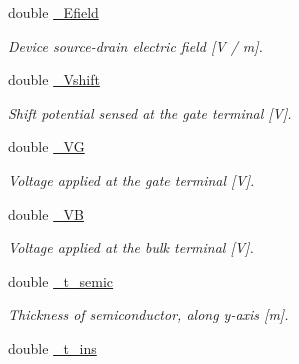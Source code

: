 \begin{DoxyCompactItemize}
\mbox{\label{class_probl_afad911eeef119fd9fd5f032c653402bb}} 
double \mbox{\hyperlink{class_probl_afad911eeef119fd9fd5f032c653402bb}{\+\_\+\+Efield}}
\begin{DoxyCompactList}\small\item\em Device source-\/drain electric field \mbox{[}V / m\mbox{]}. \end{DoxyCompactList}\item 
\mbox{\label{class_probl_ad4160e4357c48021d7f96a8499353a54}} 
double \mbox{\hyperlink{class_probl_ad4160e4357c48021d7f96a8499353a54}{\+\_\+\+Vshift}}
\begin{DoxyCompactList}\small\item\em Shift potential sensed at the gate terminal \mbox{[}V\mbox{]}. \end{DoxyCompactList}\item 
\mbox{\label{class_probl_ae52092839f1dc1dab7e6b076b0ee272b}} 
double \mbox{\hyperlink{class_probl_ae52092839f1dc1dab7e6b076b0ee272b}{\+\_\+\+VG}}
\begin{DoxyCompactList}\small\item\em Voltage applied at the gate terminal \mbox{[}V\mbox{]}. \end{DoxyCompactList}\item 
\mbox{\label{class_probl_ad42ca3b122970b9782a1b76349ec4b05}} 
double \mbox{\hyperlink{class_probl_ad42ca3b122970b9782a1b76349ec4b05}{\+\_\+\+VB}}
\begin{DoxyCompactList}\small\item\em Voltage applied at the bulk terminal \mbox{[}V\mbox{]}. \end{DoxyCompactList}\item 
\mbox{\label{class_probl_ad8663cbe5d931041ea588344559b428a}} 
double \mbox{\hyperlink{class_probl_ad8663cbe5d931041ea588344559b428a}{\+\_\+t\+\_\+semic}}
\begin{DoxyCompactList}\small\item\em Thickness of semiconductor, along y-\/axis \mbox{[}m\mbox{]}. \end{DoxyCompactList}\item 
\mbox{\label{class_probl_a134179787ded931e9c2bad46e43563ca}} 
double \mbox{\hyperlink{class_probl_a134179787ded931e9c2bad46e43563ca}{\+\_\+t\+\_\+ins}}

\end{DoxyCompactItemize}
